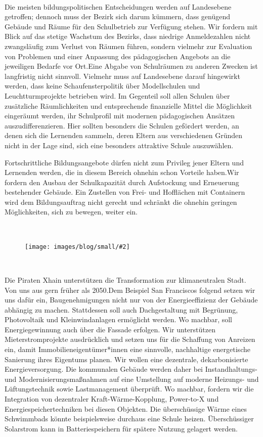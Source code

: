 \documentclass[a4paper,10pt]{article}
\newcommand{\mysection}[1]{{\vspace{1cm}\noindent\color{gray}{\ttfamily\LARGE\raggedright #1}\\\medskip}}
\newcommand{\abschnitt}[2]{%
\mysection{\raggedright #1}%
\begin{figure}[t]%
\vspace*{-2.7cm}%
\hspace*{-2.1cm}%
\texttt{[image: images/blog/small/\#2]} %
\end{figure}%
}
\newcommand{\bottomfigure}[1]{
\parbox{5cm}{
\vspace*{1cm}%
\texttt{[image: ./images/blog/small/\#1]}
}
}
\begin{document}


\mysection{Schule}

Die meisten bildungspolitischen Entscheidungen werden auf Landesebene
getroffen; dennoch muss der Bezirk sich darum kümmern, dass genügend
Gebäude und Räume für den Schulbetrieb zur Verfügung stehen. Wir fordern
mit Blick auf das stetige Wachstum des Bezirks, dass niedrige
Anmeldezahlen nicht zwangsläufig zum Verlust von Räumen führen, sondern
vielmehr zur Evaluation von Problemen und einer Anpassung des
pädagogischen Angebots an die jeweiligen Bedarfe vor Ort.Eine Abgabe von
Schulräumen zu anderen Zwecken ist langfristig nicht sinnvoll. Vielmehr
muss auf Landesebene darauf hingewirkt werden, dass keine
Schaufensterpolitik über Modellschulen und Leuchtturmprojekte betrieben
wird. Im Gegenteil soll allen Schulen über zusätzliche Räumlichkeiten
und entsprechende finanzielle Mittel die Möglichkeit eingeräumt werden,
ihr Schulprofil mit modernen pädagogischen Ansätzen auszudifferenzieren.
Hier sollten besonders die Schulen gefördert werden, an denen sich die
Lernenden sammeln, deren Eltern aus verschiedenen Gründen nicht in der
Lage sind, sich eine besonders attraktive Schule auszuwählen.

Fortschrittliche Bildungsangebote dürfen nicht zum Privileg jener Eltern
und Lernenden werden, die in diesem Bereich ohnehin schon Vorteile
haben.Wir fordern den Ausbau der Schulkapazität durch Aufstockung und
Erneuerung bestehender Gebäude. Ein Zustellen von Frei- und Hofflächen
mit Containern wird dem Bildungsauftrag nicht gerecht und schränkt die
ohnehin geringen Möglichkeiten, sich zu bewegen, weiter ein.

\abschnitt{}{establishment.jpg}
\mysection{Energiewende}
\vspace*{-1.5cm}

Die Piraten Xhain unterstützen die Transformation zur klimaneutralen
Stadt. Von uns aus gern früher als 2050.Dem Beispiel San Franciscos
folgend setzen wir uns dafür ein, Baugenehmigungen nicht nur von der
Energieeffizienz der Gebäude abhängig zu machen. Stattdessen soll auch
Dachgestaltung mit Begrünung, Photovoltaik und Kleinwindanlagen
ermöglicht werden. Wo machbar, soll Energiegewinnung auch über die
Fassade erfolgen. Wir unterstützen Mieterstromprojekte ausdrücklich und
setzen uns für die Schaffung von Anreizen ein, damit
Immobilieneigentümer*innen eine sinnvolle, nachhaltige energetische
Sanierung ihres Eigentums planen. Wir wollen eine dezentrale,
dekarbonisierte Energieversorgung. Die kommunalen Gebäude werden daher
bei Instandhaltungs- und Modernisierungsmaßnahmen auf eine Umstellung
auf moderne Heizungs- und Lüftungstechnik sowie Lastmanagement
überprüft. Wo machbar, fordern wir die Integration von dezentraler
Kraft-Wärme-Kopplung, Power-to-X und Energiespeichertechniken bei diesen
Objekten. Die überschüssige Wärme eines Schwimmbads könnte
beispielsweise durchaus eine Schule heizen. Überschüssiger Solarstrom
kann in Batteriespeichern für spätere Nutzung gelagert werden.
\end{document}
